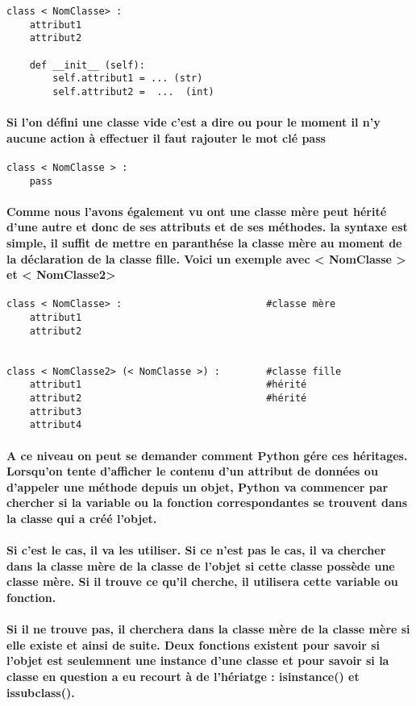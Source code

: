 \documentclass[a4paper, 12pt, twoside]{article}
\begin{document}
\begin{verbatim}
class < NomClasse> : 
    attribut1
    attribut2 

    def __init__ (self):
        self.attribut1 = ... (str)
        self.attribut2 =  ...  (int)
\end{verbatim}
\paragraph{ Si l'on défini une classe vide c'est a dire ou pour le moment il n'y aucune action à effectuer il faut rajouter le mot clé pass}
\begin{verbatim}
class < NomClasse > : 
    pass 
\end{verbatim}

\paragraph{Comme nous l'avons également vu ont une classe mère peut hérité d'une autre et donc de ses attributs et de ses méthodes. la syntaxe est simple, il suffit de mettre en paranthése la classe mère au moment de la déclaration de la classe fille. Voici un exemple avec < NomClasse > et < NomClasse2>}
\begin{verbatim}
class < NomClasse> :                         #classe mère
    attribut1
    attribut2 


class < NomClasse2> (< NomClasse >) :        #classe fille
    attribut1                                #hérité 
    attribut2                                #hérité 
    attribut3   
    attribut4
\end{verbatim}
\paragraph{ A ce niveau on peut se demander comment Python gére ces héritages. Lorsqu’on tente d’afficher le contenu d’un attribut de données
ou d’appeler une méthode depuis un objet, Python va commencer par chercher si la variable ou la fonction correspondantes se trouvent dans la classe qui a créé l’objet.}
\paragraph{ Si c’est le cas, il va les utiliser. Si ce n’est pas le cas, il va chercher dans la classe mère de la classe de l’objet si cette classe possède une classe mère. Si il trouve ce qu’il cherche, il utilisera cette variable ou fonction.}
\paragraph{Si il ne trouve pas, il cherchera dans la classe mère de la classe mère si elle existe et ainsi de suite. Deux fonctions existent pour savoir si l'objet est seulemnent  une instance d'une classe et pour savoir si la classe en question a eu recourt à de l'hériatge : isinstance() et issubclass(). }
\end{document}
